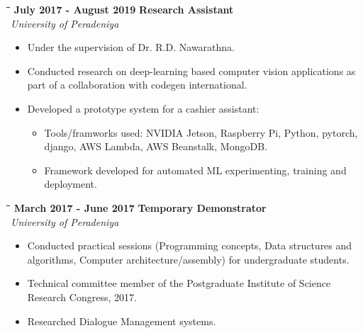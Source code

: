 \documentclass[a4paper,9.5pt]{article}
\newcommand{\timeline}[3]{%
  \begin{tabbing}
    \=\hspace*{1cm}\=\hspace*{6cm}\=\hspace*{5cm}\= \kill
    \>\>\textbf{#1} \> \textbf{#2}\\\>\>\> \emph{#3}
  \end{tabbing}
}
\begin{document}
\vspace{-0.1cm}
\begin{center}
  \begin{minipage}[h]{0.95\linewidth}
    \timeline{July 2017 - August 2019}{Research Assistant}{University of Peradeniya}
    \centering
    \vspace{-0.3cm}
    \begin{itemize}
      \setlength\itemsep{-0.1cm}
    \item Under the supervision of Dr. R.D. Nawarathna.
    \item Conducted research on deep-learning based computer vision applications as part of a collaboration with codegen international.
    \item Developed a prototype system for a cashier assistant:
      \vspace{-5pt}
      \begin{itemize}
        \setlength\itemsep{-0.1cm}
      \item Tools/framworks used: NVIDIA Jetson, Raspberry Pi, Python, pytorch, django, AWS Lambda, AWS Beanstalk, MongoDB.
      \item Framework developed for automated ML experimenting, training and deployment.
      \end{itemize}
    \end{itemize}
  \end{minipage}
\end{center}
\vspace{-0.1cm}
\begin{center}
  \begin{minipage}[h]{0.95\linewidth}
    \timeline{March 2017 - June 2017}{Temporary Demonstrator}{University of Peradeniya}
    \centering
    \vspace{-0.3cm}
    \begin{itemize}
      \setlength\itemsep{-0.1cm}
    \item Conducted practical sessions (Programming concepts, Data structures and algorithms, Computer architecture/assembly) for undergraduate students. %
    \item Technical committee member of the Postgraduate Institute of Science Research Congress, 2017.
    \item Researched Dialogue Management systems.
    \end{itemize}
  \end{minipage}
\end{center}
\vspace{-0.1cm}
\end{document}
